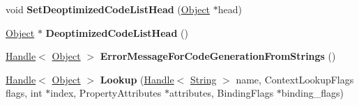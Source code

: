\begin{DoxyCompactItemize}
\item 
void {\bfseries Set\+Deoptimized\+Code\+List\+Head} (\hyperlink{classv8_1_1internal_1_1_object}{Object} $\ast$head)\hypertarget{classv8_1_1internal_1_1_context_ae902424ecfd83e8bdc92b25528625960}{}\label{classv8_1_1internal_1_1_context_ae902424ecfd83e8bdc92b25528625960}

\item 
\hyperlink{classv8_1_1internal_1_1_object}{Object} $\ast$ {\bfseries Deoptimized\+Code\+List\+Head} ()\hypertarget{classv8_1_1internal_1_1_context_acd39dde9e75a0164771dff091f81eddd}{}\label{classv8_1_1internal_1_1_context_acd39dde9e75a0164771dff091f81eddd}

\item 
\hyperlink{classv8_1_1internal_1_1_handle}{Handle}$<$ \hyperlink{classv8_1_1internal_1_1_object}{Object} $>$ {\bfseries Error\+Message\+For\+Code\+Generation\+From\+Strings} ()\hypertarget{classv8_1_1internal_1_1_context_a74c1859a9dab38be17728aaaa4d33285}{}\label{classv8_1_1internal_1_1_context_a74c1859a9dab38be17728aaaa4d33285}

\item 
\hyperlink{classv8_1_1internal_1_1_handle}{Handle}$<$ \hyperlink{classv8_1_1internal_1_1_object}{Object} $>$ {\bfseries Lookup} (\hyperlink{classv8_1_1internal_1_1_handle}{Handle}$<$ \hyperlink{classv8_1_1internal_1_1_string}{String} $>$ name, Context\+Lookup\+Flags flags, int $\ast$index, Property\+Attributes $\ast$attributes, Binding\+Flags $\ast$binding\+\_\+flags)\hypertarget{classv8_1_1internal_1_1_context_a87f11b1b843d961340a289812875d128}{}\label{classv8_1_1internal_1_1_context_a87f11b1b843d961340a289812875d128}

\end{DoxyCompactItemize}
